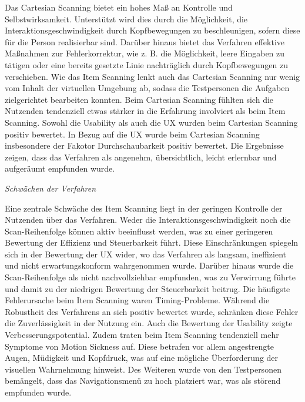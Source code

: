 Das Cartesian Scanning bietet ein hohes Maß an Kontrolle und Selbstwirksamkeit. Unterstützt wird dies durch die Möglichkeit, die Interaktionsgeschwindigkeit durch Kopfbewegungen zu beschleunigen, sofern diese für die Person realisierbar sind. Darüber hinaus bietet das Verfahren effektive Maßnahmen zur Fehlerkorrektur, wie z. B.  die Möglichkeit, leere Eingaben zu tätigen oder eine bereits gesetzte Linie nachträglich durch Kopfbewegungen zu verschieben.
Wie das Item Scanning lenkt auch das Cartesian Scanning nur wenig vom Inhalt der virtuellen Umgebung ab, sodass die Testpersonen die Aufgaben zielgerichtet bearbeiten konnten. Beim Cartesian Scanning fühlten sich die Nutzenden tendenziell etwas stärker in die Erfahrung involviert als beim Item Scanning.
Sowohl die Usability als auch die UX wurden beim Cartesian Scanning positiv bewertet. In Bezug auf die UX wurde beim Cartesian Scanning insbesondere der Fakotor Durchschaubarkeit positiv bewertet. Die Ergebnisse zeigen, dass das Verfahren als angenehm, übersichtlich, leicht erlernbar und aufgeräumt empfunden wurde.

\textit{Schwächen der Verfahren}

Eine zentrale Schwäche des Item Scanning liegt in der geringen Kontrolle der Nutzenden über das Verfahren. Weder die Interaktionsgeschwindigkeit noch die Scan-Reihenfolge können aktiv beeinflusst werden, was zu einer geringeren Bewertung der Effizienz und Steuerbarkeit führt. Diese Einschränkungen spiegeln sich in der Bewertung der UX wider, wo das Verfahren als langsam, ineffizient und nicht erwartungskonform wahrgenommen wurde. Darüber hinaus wurde die Scan-Reihenfolge als nicht nachvollziehbar empfunden, was zu Verwirrung führte und damit zu der niedrigen Bewertung der Steuerbarkeit beitrug.
Die häufigste Fehlerursache beim Item Scanning waren Timing-Probleme. Während die Robustheit des Verfahrens an sich positiv bewertet wurde, schränken diese Fehler die Zuverlässigkeit in der Nutzung ein. Auch die Bewertung der Usability zeigte Verbesserungspotential.
Zudem traten beim Item Scanning tendenziell mehr Symptome von Motion Sickness auf. Diese betrafen vor allem angestrengte Augen, Müdigkeit und Kopfdruck, was auf eine mögliche Überforderung der visuellen Wahrnehmung hinweist. Des Weiteren wurde von den Testpersonen bemängelt, dass das Navigationsmenü zu hoch platziert war, was als störend empfunden wurde. 


